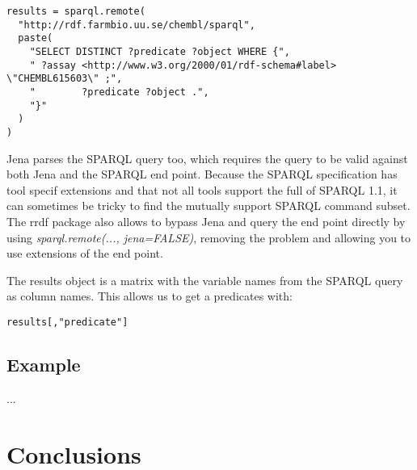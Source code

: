 \documentclass[12pt]{article}
\begin{document}
\begin{verbatim}
results = sparql.remote(
  "http://rdf.farmbio.uu.se/chembl/sparql",
  paste(
    "SELECT DISTINCT ?predicate ?object WHERE {",
    " ?assay <http://www.w3.org/2000/01/rdf-schema#label> \"CHEMBL615603\" ;",
    "        ?predicate ?object .",
    "}"
  )
) 
\end{verbatim}

Jena parses the SPARQL query too, which requires the query to be valid
against both Jena and the SPARQL end point. Because the SPARQL specification has tool specif
extensions and that not all tools support the full of SPARQL 1.1, it can sometimes be tricky
to find the mutually support SPARQL command subset. The rrdf package also allows to bypass
Jena and query the end point directly by using \emph{sparql.remote(..., jena=FALSE)},
removing the problem and allowing you to use extensions of the end point.

The results object is a matrix with the variable names from the SPARQL query as column names.
This allows us to get a predicates with:

\begin{verbatim}
results[,"predicate"]
\end{verbatim}

\subsection{Example}

...

%
%

\section{Conclusions}
\end{document}
